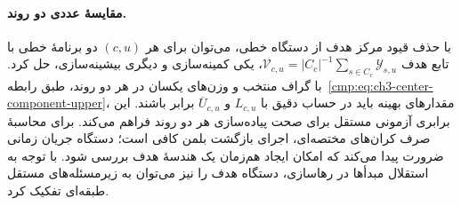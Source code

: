 \paragraph{مقایسهٔ عددی دو روند.}
با حذف قیود مرکز هدف از دستگاه خطی، می‌توان برای هر $(c,u)$ دو برنامهٔ خطی با تابع هدف $\mathcal V_{c,u}=|C_c|^{-1}\sum_{s\in C_c}\mathscr Y_{s,u}$، یکی کمینه‌سازی و دیگری بیشینه‌سازی، حل کرد. با گراف منتخب و وزن‌های یکسان در هر دو روند، طبق رابطه~\eqref{cmp:eq:ch3-center-component-upper}، مقدارهای بهینه باید در حساب دقیق با $L_{c,u}$ و $\overline U_{c,u}$ برابر باشند. این برابری آزمونی مستقل برای صحت پیاده‌سازی هر دو روند فراهم می‌کند. برای محاسبهٔ صرف کران‌های مختصه‌ای، اجرای بازگشت بلمن کافی است؛ دستگاه جریان زمانی ضرورت پیدا می‌کند که امکان ایجاد هم‌زمان یک هندسهٔ هدف بررسی شود. با توجه به استقلال مبدأها در رهاسازی، دستگاه هدف را نیز می‌توان به زیرمسئله‌های مستقل طبقه‌ای تفکیک کرد.
